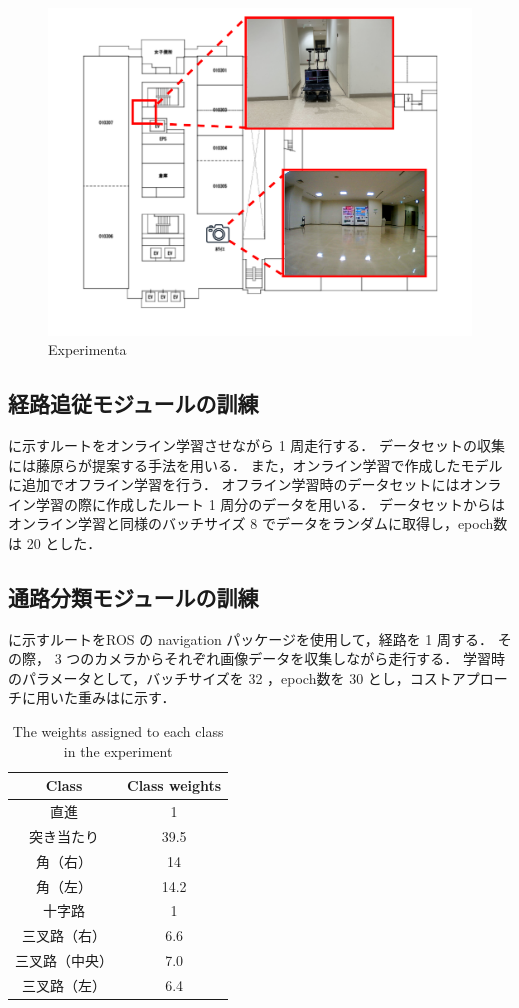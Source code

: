 \begin{figure}
  \centering
  \includegraphics[width=130mm]{images/pdf/ishiguro/keepout.pdf}
  \caption{Experimenta}
  \label{fig:keepout}
\end{figure}

\clearpage
\subsection{経路追従モジュールの訓練}
に示すルートをオンライン学習させながら 1 周走行する．
データセットの収集には藤原ら\cite{fujiwara2023}が提案する手法を用いる．
また，オンライン学習で作成したモデルに追加でオフライン学習を行う．
オフライン学習時のデータセットにはオンライン学習の際に作成したルート 1 周分のデータを用いる．
データセットからはオンライン学習と同様のバッチサイズ 8 でデータをランダムに取得し，epoch数は 20 とした．

\subsection{通路分類モジュールの訓練}
に示すルートをROS の navigation パッケージを使用して，経路を 1 周する．
その際， 3 つのカメラからそれぞれ画像データを収集しながら走行する．
学習時のパラメータとして，バッチサイズを 32 ，epoch数を 30 とし，コストアプローチに用いた重みはに示す．

\begin{table}[htbp]
  \centering
  \caption{The weights assigned to each class in the experiment}\label{tab:cost}
  \begin{tabular}{c|c}
  \hline
  Class & Class weights\\
  \hline
  直進   & 1\\
  突き当たり   & 39.5\\
  角（右） & 14\\
  角（左）& 14.2 \\
  十字路 & 1  \\
  三叉路（右）& 6.6  \\
  三叉路（中央）& 7.0  \\
  三叉路（左） & 6.4  \\
  \hline
  \end{tabular}
\end{table}

